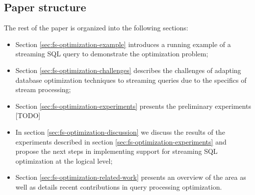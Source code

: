 \subsection{Paper structure}
The rest of the paper is organized into the following sections:

\begin{itemize}
    \item Section \ref{sec:fs-optimization-example} introduces a running example of a streaming SQL query to demonstrate the optimization problem;
    \item Section \ref{sec:fs-optimization-challenges} describes the challenges of adapting database optimization techniques to streaming queries due to the specifics of stream processing;
    \item Section \ref{sec:fs-optimization-experiments} presents the preliminary experiments [TODO]
    \item In section \ref{sec:fs-optimization-discussion} we discuss the results of the experiments described in section \ref{sec:fs-optimization-experiments} and propose the next steps in implementing support for streaming SQL optimization at the logical level;
    \item Section \ref{sec:fs-optimization-related-work} presents an overview of the area as well as details recent contributions in query processing optimization.
\end{itemize}


